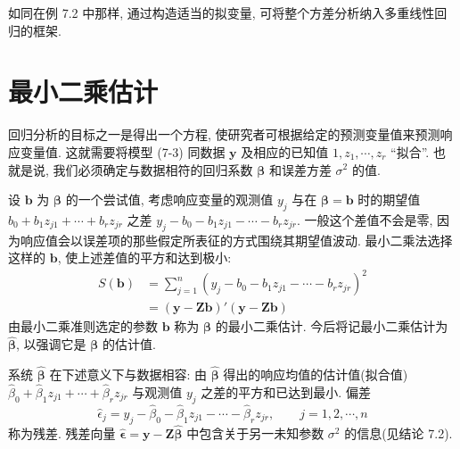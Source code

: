 
如同在例 7.2 中那样, 通过构造适当的拟变量, 可将整个方差分析纳入多重线性回归的框架.

\section{最小二乘估计}
\label{sec:7.3}

回归分析的目标之一是得出一个方程, 使研究者可根据给定的预测变量值来预测响应变量值. 这就需要将模型 (7-3) 同数据 $\mathbf{y}$ 及相应的已知值 $1,z_1,\cdots,z_r$ ``拟合''. 也就是说, 我们必须确定与数据相符的回归系数 $\boldsymbol{\beta}$ 和误差方差 $\sigma^2$ 的值.

设 $\mathbf{b}$ 为 $\boldsymbol{\beta}$ 的一个尝试值, 考虑响应变量的观测值 $y_j$ 与在 $\boldsymbol{\beta}=\mathbf{b}$ 时的期望值 $b_0+b_1 z_{j1}+\cdots+b_r z_{jr}$ 之差 $y_j-b_0-b_1 z_{j1}-\cdots-b_r z_{jr}$. 一般这个差值不会是零, 因为响应值会以误差项的那些假定所表征的方式围绕其期望值波动. 最小二乘法选择这样的 $\mathbf{b}$, 使上述差值的平方和达到极小:
\label{eq:7-4}
\begin{equation}
\begin{aligned}
S(\mathbf{b})&=\sum_{j=1}^{n}(y_j-b_0-b_1 z_{j1}-\cdots-b_r z_{jr})^2\\
&=(\mathbf{y}-\mathbf{Z}\mathbf{b})'(\mathbf{y}-\mathbf{Z}\mathbf{b})
\end{aligned}
\tag{7-4}
\end{equation}
由最小二乘准则选定的参数 $\mathbf{b}$ 称为 $\boldsymbol{\beta}$ 的最小二乘估计. 今后将记最小二乘估计为 $\hat{\boldsymbol{\beta}}$, 以强调它是 $\boldsymbol{\beta}$ 的估计值.

系统 $\hat{\boldsymbol{\beta}}$ 在下述意义下与数据相容: 由 $\hat{\boldsymbol{\beta}}$ 得出的响应均值的估计值(拟合值) $\hat{\beta}_0+\hat{\beta}_1 z_{j1}+\cdots+\hat{\beta}_r z_{jr}$ 与观测值 $y_j$ 之差的平方和已达到最小. 偏差
\label{eq:7-5}
\begin{equation}
\hat{\epsilon}_j=y_j-\hat{\beta}_0-\hat{\beta}_1 z_{j1}-\cdots-\hat{\beta}_r z_{jr},\qquad j=1,2,\cdots,n
\tag{7-5}
\end{equation}
称为残差. 残差向量 $\hat{\boldsymbol{\epsilon}}=\mathbf{y}-\mathbf{Z}\hat{\boldsymbol{\beta}}$ 中包含关于另一未知参数 $\sigma^2$ 的信息(见结论 7.2).

